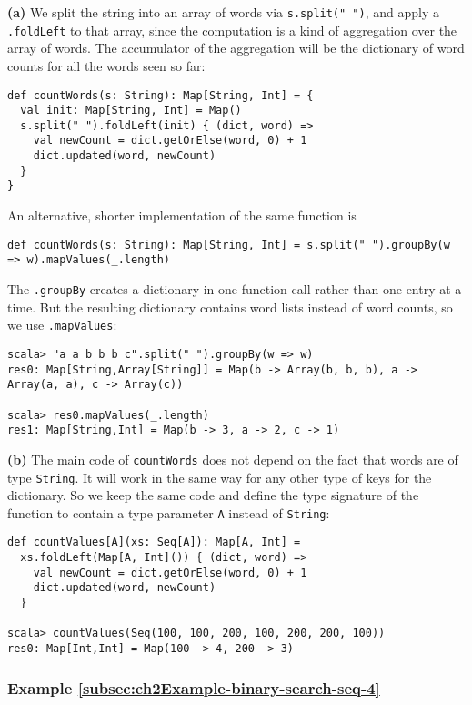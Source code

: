 \textbf{(a)} We split the string into an array of words via \lstinline!s.split(" ")!,
and apply a \lstinline!.foldLeft! to that array, since the computation
is a kind of aggregation over the array of words. The accumulator
of the aggregation will be the dictionary of word counts for all the
words seen so far:
\begin{lstlisting}
def countWords(s: String): Map[String, Int] = {
  val init: Map[String, Int] = Map()
  s.split(" ").foldLeft(init) { (dict, word) =>
    val newCount = dict.getOrElse(word, 0) + 1
    dict.updated(word, newCount)
  }
}
\end{lstlisting}
An alternative, shorter implementation of the same function is
\begin{lstlisting}
def countWords(s: String): Map[String, Int] = s.split(" ").groupBy(w => w).mapValues(_.length)
\end{lstlisting}
The \lstinline!.groupBy! creates a dictionary in one function call
rather than one entry at a time. But the resulting dictionary contains
word lists instead of word counts, so we use \lstinline!.mapValues!:
\begin{lstlisting}
scala> "a a b b b c".split(" ").groupBy(w => w)
res0: Map[String,Array[String]] = Map(b -> Array(b, b, b), a -> Array(a, a), c -> Array(c))

scala> res0.mapValues(_.length)
res1: Map[String,Int] = Map(b -> 3, a -> 2, c -> 1)
\end{lstlisting}

\textbf{(b)} The main code of \lstinline!countWords! does not depend
on the fact that words are of type \lstinline!String!. It will work
in the same way for any other type of keys for the dictionary. So
we keep the same code and define the type signature of the function
to contain a type parameter \lstinline!A! instead of \lstinline!String!:
\begin{lstlisting}
def countValues[A](xs: Seq[A]): Map[A, Int] =
  xs.foldLeft(Map[A, Int]()) { (dict, word) =>
    val newCount = dict.getOrElse(word, 0) + 1
    dict.updated(word, newCount)
  }

scala> countValues(Seq(100, 100, 200, 100, 200, 200, 100))
res0: Map[Int,Int] = Map(100 -> 4, 200 -> 3)
\end{lstlisting}


\subsubsection{Example \label{subsec:ch2Example-binary-search-seq-4}\ref{subsec:ch2Example-binary-search-seq-4}}

